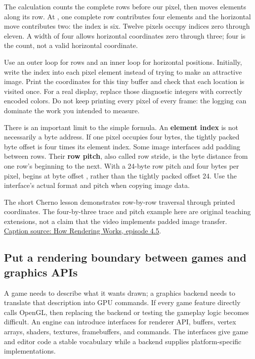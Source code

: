 The calculation counts the  complete rows before our pixel, then moves  elements along its row. At , one complete row contributes four elements and the horizontal move contributes two: the index is six. Twelve pixels occupy indices zero through eleven. A width of four allows horizontal coordinates zero through three; four is the count, not a valid horizontal coordinate.

Use an outer loop for rows and an inner loop for horizontal positions. Initially, write the index into each pixel element instead of trying to make an attractive image. Print the coordinates for this tiny buffer and check that each location is visited once. For a real display, replace those diagnostic integers with correctly encoded colors. Do not keep printing every pixel of every frame: the logging can dominate the work you intended to measure.

There is an important limit to the simple formula. An \textbf{element index} is not necessarily a byte address. If one pixel occupies four bytes, the tightly packed byte offset is four times its element index. Some image interfaces add padding between rows. Their \textbf{row pitch}, also called row stride, is the byte distance from one row's beginning to the next. With a 24-byte row pitch and four bytes per pixel,  begins at byte offset , rather than the tightly packed offset 24. Use the interface's actual format and pitch when copying image data.

The short Cherno lesson demonstrates row-by-row traversal through printed coordinates. The four-by-three trace and pitch example here are original teaching extensions, not a claim that the video implements padded image transfer. \href{https://www.youtube.com/watch?v=6dOIju7--Jg}{Caption source: How Rendering Works, episode 4.5}.

\subsection{Put a rendering boundary between games and graphics APIs}\label{06-engine-ii-ch025-put-a-rendering-boundary-between-games-and-graphics-apis}

\hypertarget{06-engine-ii-ch025-put-a-rendering-boundary-between-games-and-graphics-apis}{}

A game needs to describe what it wants drawn; a graphics backend needs to translate that description into GPU commands. If every game feature directly calls OpenGL, then replacing the backend or testing the gameplay logic becomes difficult. An engine can introduce interfaces for renderer API, buffers, vertex arrays, shaders, textures, framebuffers, and commands. The interfaces give game and editor code a stable vocabulary while a backend supplies platform-specific implementations.

